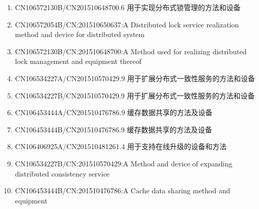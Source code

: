 \documentclass[scheme=plain]{ctexart}
\begin{document}
\begin{enumerate}
    \item CN106572130B/CN201510648700.6 用于实现分布式锁管理的方法和设备
    \item CN106572054B/CN:201510650637:A Distributed lock service realization method and device for distributed system
    \item CN106572130B/CN:201510648700:A Method used for realizing distributed lock management and equipment thereof
    \item CN106534227A/CN201510570429.9 用于扩展分布式一致性服务的方法和设备
    \item CN106534227B/CN201510570429.9 用于扩展分布式一致性服务的方法和设备
    \item CN106453444A/CN201510476786.9 缓存数据共享的方法及设备
    \item CN106453444B/CN201510476786.9 缓存数据共享的方法及设备
    \item CN106406925A/CN201510481261.4 用于支持在线升级的设备和方法
    \item CN106534227B/CN:201510570429:A Method and device of expanding distributed consistency service
    \item CN106453444B/CN:201510476786:A Cache data sharing method and equipment
\end{enumerate}
\end{document}

